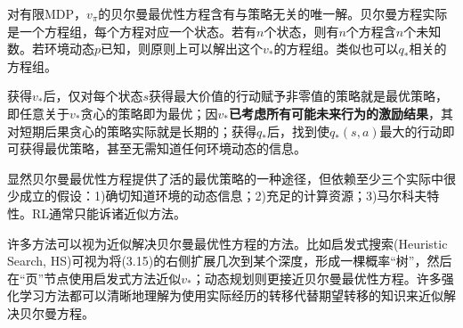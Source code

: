 \documentclass{ctexart}
\begin{document}
对有限MDP，$v_\pi$的贝尔曼最优性方程含有与策略无关的唯一解。贝尔曼方程实际是一个方程组，每个方程对应一个状态。若有$n$个状态，则有$n$个方程含$n$个未知数。若环境动态$p$已知，则原则上可以解出这个$v_*$的方程组。类似也可以$q_*$相关的方程组。

获得$v_*$后，仅对每个状态$s$获得最大价值的行动赋予非零值的策略就是最优策略，即任意关于$v_*$贪心的策略即为最优；因$v_*$\textbf{已考虑所有可能未来行为的激励结果}，其对短期后果贪心的策略实际就是长期的；获得$q_*$后，找到使$q_*(s,a)$最大的行动即可获得最优策略，甚至无需知道任何环境动态的信息。

显然贝尔曼最优性方程提供了活的最优策略的一种途径，但依赖至少三个实际中很少成立的假设：1)确切知道环境的动态信息；2)充足的计算资源；3)马尔科夫特性。RL通常只能诉诸近似方法。

许多方法可以视为近似解决贝尔曼最优性方程的方法。比如启发式搜索(Heuristic Search, HS)可视为将(3.15)的右侧扩展几次到某个深度，形成一棵概率“树”，然后在“页”节点使用启发式方法近似$v_*$；动态规划则更接近贝尔曼最优性方程。许多强化学习方法都可以清晰地理解为使用实际经历的转移代替期望转移的知识来近似解决贝尔曼方程。
\end{document}
